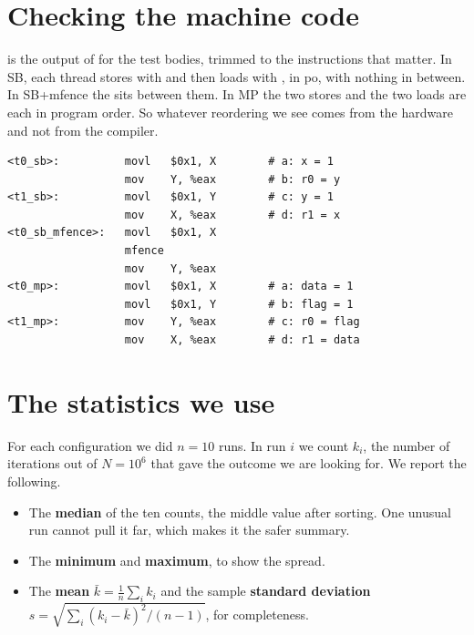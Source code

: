 \section{Checking the machine code}
\label{sec:asm}

 is the output of  for the test bodies, trimmed to the instructions that matter. In SB, each thread stores with  and then loads with , in \gls{po}, with nothing in between. In SB+mfence the  sits between them. In MP the two stores and the two loads are each in program order. So whatever reordering we see comes from the hardware and not from the compiler.

\begin{lstlisting}[language=asmx, caption={Machine code of the test bodies, from \texttt{objdump -d} (GCC 13.3.0, \texttt{-O2}).}, label={lst:disasm}, captionpos=b]
<t0_sb>:          movl   $0x1, X        # a: x = 1
                  mov    Y, %eax        # b: r0 = y
<t1_sb>:          movl   $0x1, Y        # c: y = 1
                  mov    X, %eax        # d: r1 = x
<t0_sb_mfence>:   movl   $0x1, X
                  mfence
                  mov    Y, %eax
<t0_mp>:          movl   $0x1, X        # a: data = 1
                  movl   $0x1, Y        # b: flag = 1
<t1_mp>:          mov    Y, %eax        # c: r0 = flag
                  mov    X, %eax        # d: r1 = data
\end{lstlisting}

\section{The statistics we use}
\label{sec:stats}

For each configuration we did $n = 10$ runs. In run $i$ we count $k_i$, the number of iterations out of $N = 10^6$ that gave the outcome we are looking for. We report the following.
\begin{itemize}
\item The \textbf{median} of the ten counts, the middle value after sorting. One unusual run cannot pull it far, which makes it the safer summary.
\item The \textbf{minimum} and \textbf{maximum}, to show the spread.
\item The \textbf{mean} $\bar{k} = \frac{1}{n}\sum_i k_i$ and the sample \textbf{standard deviation} $s = \sqrt{\sum_i (k_i - \bar{k})^2 / (n-1)}$, for completeness.
\end{itemize}

